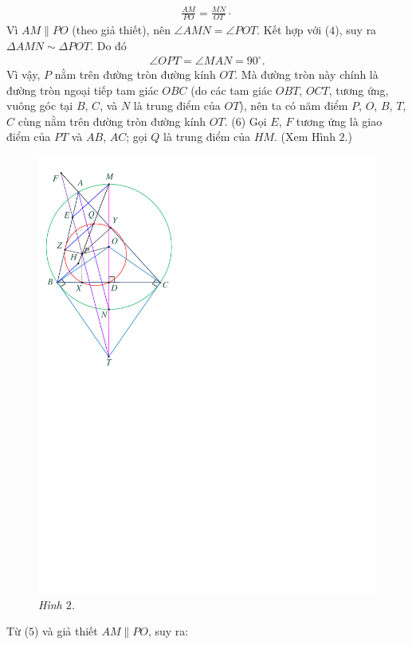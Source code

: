 \begin{multicols}{2}
	\begin{align*}
		\frac{{AM}}{{PO}} = \frac{{MN}}{{OT}} \cdot \tag{$4$}
	\end{align*}
	Vì $AM \parallel PO$ (theo giả thiết), nên \linebreak$\angle AMN = \angle POT$.  Kết hợp với ($4$), suy ra $\Delta AMN \sim  \Delta POT$. Do đó
	\begin{align*}
		\angle OPT = \angle MAN = 90^\circ. \tag{$5$}
	\end{align*}
	Vì vậy, $P$ nằm trên đường tròn đường kính $OT$. Mà đường tròn này chính là đường tròn ngoại tiếp tam giác $OBC$ (do các tam giác $OBT$, $OCT$, tương ứng, vuông góc tại $B$, $C$, và $N$ là trung điểm của $OT$), nên ta có năm điểm $P$, $O$, $B$, $T$, $C$ cùng nằm trên đường tròn đường kính $OT$. \hfill                                            ($6$)
	\vskip 0.05cm
	Gọi $E$, $F$ tương ứng là giao điểm của $PT$ và $AB$, $AC$; gọi $Q$ là trung điểm của $HM$. (Xem Hình $2$.)
	\begin{figure}[H]
		\centering
		\vspace*{-10pt}
		\captionsetup{labelformat= empty, justification=centering}
		\includegraphics[width=0.7\linewidth]{P619H2}
		\caption{\small\textit{\color{thachthuctoanhoc}Hình $2$.}}
		\vspace*{-5pt}
	\end{figure}
	Từ ($5$) và giả thiết $AM \parallel PO$, suy ra:
	\begin{align*}

\end{align*}
\end{multicols}
